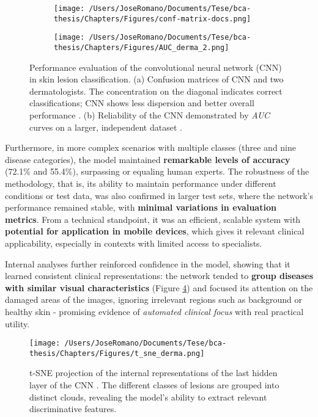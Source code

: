 \begin{figure}[htbp]
  \centering
  \begin{subfigure}[b]{0.45\textwidth}
    \centering
    \texttt{[image: /Users/JoseRomano/Documents/Tese/bca-thesis/Chapters/Figures/conf-matrix-docs.png]}
    \label{fig:conf-matrix-docs}
  \end{subfigure}
  \hfill
  \begin{subfigure}[b]{0.45\textwidth}
    \centering
    \texttt{[image: /Users/JoseRomano/Documents/Tese/bca-thesis/Chapters/Figures/AUC\_derma\_2.png]}
    \label{fig:AUC_dnn_model}
  \end{subfigure}
  \caption{Performance evaluation of the convolutional neural network (CNN) in skin lesion classification. (a) Confusion matrices of CNN and two dermatologists. The concentration on the diagonal indicates correct classifications; CNN shows less dispersion and better overall performance \cite{ai_in_dermacancer_esteva2017}. (b) Reliability of the CNN demonstrated by \textit{AUC} curves on a larger, independent dataset \cite{ai_in_dermacancer_esteva2017}.}
  \label{fig:AUC_derma_total}
\end{figure}

Furthermore, in more complex scenarios with multiple classes (three and nine
disease categories), the model maintained \textbf{remarkable levels of
  accuracy} (72.1\% and 55.4\%), surpassing or equaling human experts. The
robustness of the methodology, that is, its ability to maintain performance
under different conditions or test data, was also confirmed in larger test
sets, where the network's performance remained stable, with \textbf{minimal
  variations in evaluation metrics}. From a technical standpoint, it was an
efficient, scalable system with \textbf{potential for application in mobile
  devices}, which gives it relevant clinical applicability, especially in
contexts with limited access to specialists.

Internal analyses further reinforced confidence in the model, showing that it
learned consistent clinical representations: the network tended to
\textbf{group diseases with similar visual characteristics} (Figure
\ref{fig:tsne_derma}) and focused its attention on the damaged areas of the
images, ignoring irrelevant regions such as background or healthy skin -
promising evidence of \textit{automated clinical focus} with real practical
utility.

\begin{figure}
  \centering
  \texttt{[image: /Users/JoseRomano/Documents/Tese/bca-thesis/Chapters/Figures/t\_sne\_derma.png]}
  \caption{t-SNE projection of the internal representations of the last hidden layer of the CNN \cite{ai_in_dermacancer_esteva2017}. The different classes of lesions are grouped into distinct clouds, revealing the model's ability to extract relevant discriminative features.}
  \label{fig:tsne_derma}
\end{figure}

